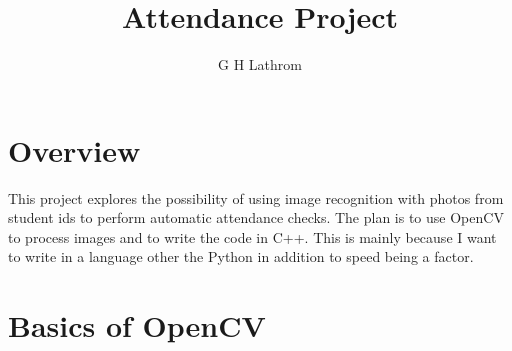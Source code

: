 \documentclass[12pt,letterpaper]{article}
\title{Attendance Project}
\author{G H Lathrom}
\begin{document}
\maketitle


\pagestyle{fancy}
\fancyhf{}
\chead{}
\fancyfoot[C]{\thepage}
\renewcommand{\headrulewidth}{.5pt}

\section{Overview}

This project explores the possibility of using image recognition with photos from student ids to perform automatic attendance checks.
The plan is to use OpenCV to process images and to write the code in C++.  
This is mainly because I want to write in a language other the Python in addition to speed being a factor.

\section{Basics of OpenCV}
\end{document}

